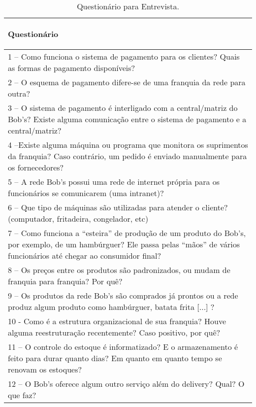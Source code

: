 \begin{table}[h]
\begin{tabular}{|p{14cm}|}
				\hline
				\begin{center}
					\textbf{Questionário}
				\end{center}
				\\ \hline
				1 – Como funciona o sistema de pagamento para os clientes? Quais as formas de pagamento disponíveis? \\ \hline
				2 – O esquema de pagamento difere-se de uma franquia da rede para outra? \\ \hline
				3 – O sistema de pagamento é interligado com a central/matriz do Bob’s? Existe alguma comunicação entre o sistema de pagamento e a central/matriz? \\ \hline
				4 –Existe alguma máquina ou programa que monitora os suprimentos da franquia? Caso contrário, um pedido é enviado manualmente para os fornecedores? \\ \hline
				5 – A rede Bob’s possui uma rede de internet própria para os funcionários se comunicarem (uma intranet)? \\ \hline
				6 – Que tipo de máquinas são utilizadas para atender o cliente? (computador, fritadeira, congelador, etc) \\ \hline
				7 – Como funciona a “esteira” de produção de um produto do Bob's, por exemplo, de um hambúrguer? Ele passa pelas “mãos” de vários funcionários até chegar ao consumidor final? \\ \hline
				8 – Os preços entre os produtos são padronizados, ou mudam de franquia para franquia? Por quê? \\ \hline
				9 – Os produtos da rede Bob’s são comprados já prontos ou a rede produz algum produto como hambúrguer, batata frita [...] ? \\ \hline
				10 - Como é a estrutura organizacional de sua franquia? Houve alguma reestruturação recentemente? Caso positivo, por quê? \\ \hline
				11 – O controle do estoque é informatizado? E o armazenamento é feito para durar quanto dias? Em quanto em quanto tempo se renovam os estoques? \\ \hline
				12 – O Bob's oferece algum outro serviço além do delivery? Qual? O que faz? \\ \hline
			\end{tabular}
			\caption[Questionário para Entrevista]{Questionário para Entrevista.}
			\label{tab:versionamento_tabl}
		\end{table}


